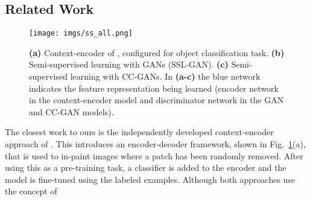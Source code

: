 \documentclass{article} %
\newcommand{\fig}[1]{Fig.~\ref{fig:#1}}
\def\etal{{\textit{et~al.~}}}
\begin{document}
\subsection{Related Work}\begin{figure}[t]
\centering
   \texttt{[image: imgs/ss\_all.png]} 
 \caption{ {\bf(a)} Context-encoder of \cite{pathak2016}, configured for object classification task. 
   {\bf(b)} Semi-supervised learning with GANs (SSL-GAN). 
   {\bf(c)} Semi-supervised learning with CC-GANs. In {\bf (a-c)} the blue network indicates the feature representation being learned (encoder network in the context-encoder model and discriminator network in the GAN and CC-GAN models).
}
 \label{fig:semisup}
\end{figure}%
The closest work to ours is the independently
developed context-encoder approach of 
\cite{pathak2016}.
This introduces an encoder-decoder framework, shown in
\fig{semisup}(a), that is used to in-paint images where a patch has
been randomly removed. After using this as a pre-training task, a
classifier is added to the encoder and the model is fine-tuned using
the labeled examples. Although both approaches use the concept of
\end{document}
